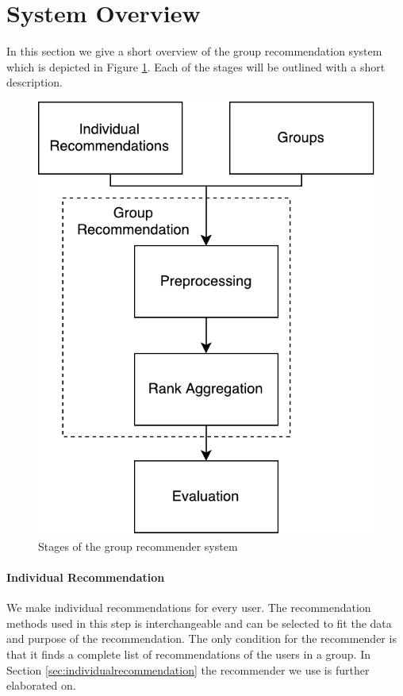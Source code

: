 \section{System Overview}\label{sec:systemoverview}
In this section we give a short overview of the group recommendation system which is depicted in Figure \ref{fig:composition}. Each of the stages will be outlined with a short description. 
\begin{figure}[H]
\centering
\includegraphics[scale=.4]{graphics/composition}
\caption{Stages of the group recommender system}\label{fig:composition}
\end{figure}
\paragraph{Individual Recommendation} We make individual recommendations for every user. The recommendation methods used in this step is interchangeable and can be selected to fit the data and purpose of the recommendation. The only condition for the recommender is that it finds a complete list of recommendations of the users in a group. In Section \ref{sec:individualrecommendation} the recommender we use is further elaborated on.

